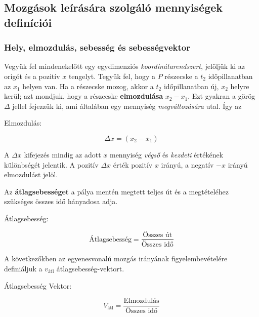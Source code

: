 \documentclass[../fizika.tex]{subfiles}
\begin{document}
    \subsection{Mozgások leírására szolgáló mennyiségek definíciói}

        \subsubsection{Hely, elmozdulás, sebesség és sebességvektor}

            Vegyük fel mindenekelőtt egy egydimenziós \textit{koordinátarendszert}, jelöljük ki az origót és a pozitív $x$ tengelyt. Tegyük fel, hogy a $P$ részecske a $t_2$ időpillanatban az $x_1$ helyen van. Ha a részecske mozog, akkor a $t_2$ időpillanatban új, $x_2$ helyre kerül; azt mondjuk, hogy a részecske \textbf{elmozdulása} $x_2-x_1$. Ezt gyakran a görög $\Delta$ jellel fejezzük ki, ami általában egy mennyiség \textit{megváltozására} utal. Így az 
            
            Elmozdulás:

            \begin{equation} \tag{1-1} \label{eq:1-1}
                \Delta x = (x_2-x_1)
            \end{equation} 
            
            \noindent A $\Delta x$ kifejezés mindig az adott $x$ mennyiség \textit{végső} és \textit{kezdeti} értékének különbségét jelentik. A pozitív $\Delta x$ érték pozitív $x$ irányú, a negatív $-x$ irányú elmozdulást jelöl.

            Az \textbf{átlagsebességet} a pálya mentén megtett teljes út és a megtételéhez szükséges összes idő hányadosa adja.

            Átlagsebesség:

            \begin{equation} \tag{1-2} \label{eq:1-2}
                \text{Átlagsebesség} = \frac{\text{Összes út}}{\text{Összes idő}} 
            \end{equation} 

            A következőkben az egyenesvonalú mozgás irányának figyelembevételére definiáljuk a $v_{\text{átl}}$ átlagsebesség-vektort.

            Átlagsebesség Vektor:

            \begin{equation*}
                V_{\text{átl}} = \frac{\text{Elmozdulás}}{\text{Összes idő}}
            \end{equation*}   
\end{document}
